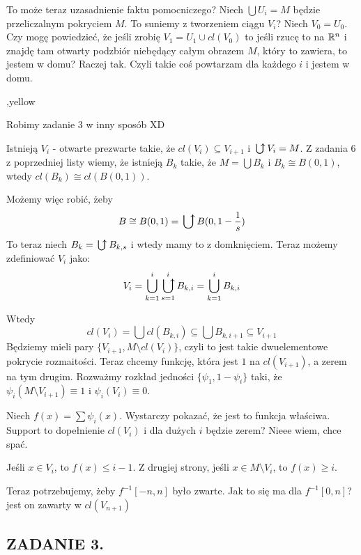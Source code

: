 \documentclass{article}
\begin{document}
To może teraz uzasadnienie faktu pomocniczego?
Niech $\bigcup U_i=M$ będzie przeliczalnym pokryciem $M$.
To suniemy z tworzeniem ciągu $V_i$? Niech $V_0=U_0$. Czy mogę powiedzieć, że jeśli zrobię $V_1=U_1\cup cl(V_0)$ to jeśli rzucę to na $\mathbb{R}^n$ i znajdę tam otwarty podzbiór niebędący całym obrazem $M$, który to zawiera, to jestem w domu? Raczej tak. Czyli takie coś powtarzam dla każdego $i$ i jestem w domu.

\sep{yellow}

Robimy zadanie 3 w inny sposób XD

Istnieją $V_i$ - otwarte prezwarte takie, że $cl(V_i)\subseteq V_{i+1}$ i $\abigcup V_i=M$. Z zadania 6 z poprzedniej listy wiemy, że istnieją $B_k$ takie, że $M=\bigcup B_k$ i $B_k\cong B(0,1)$, wtedy $cl(B_k)\cong cl(B(0,1))$. 

Możemy więc robić, żeby
$$B\cong B(0,1)=\abigcup B(0,1-\frac1{s})$$
To teraz niech $B_k=\abigcup B_{k,s}$ i wtedy mamy to z domknięciem. Teraz możemy zdefiniować $V_i$ jako:
$$V_i=\bigcup\limits_{k=1}^i\abigcup\limits_{s=1}^iB_{k,i}=\bigcup\limits_{k=1}^iB_{k,i}$$

Wtedy 
$$cl(V_i)=\bigcup cl(B_{k,i})\subseteq \bigcup B_{k,i+1}\subseteq V_{i+1}$$
Będziemy mieli pary $\{V_{i+1},M\setminus cl(V_i)\}$, czyli to jest takie dwuelementowe pokrycie rozmaitości. Teraz chcemy funkcję, która jest $1$ na $cl(V_{i+1})$, a zerem na tym drugim. Rozważmy rozkład jedności $\{\psi_1,1-\psi_i\}$ taki, że $\psi_i(M\setminus V_{i+1})\equiv 1$ i $\psi_i(V_i)\equiv 0$.

Niech $f(x)=\sum\psi_i(x)$. Wystarczy pokazać, że jest to funkcja właściwa. Support to dopełnienie $cl(V_i)$ i dla dużych $i$ będzie zerem? Nieee wiem, chce spać.

Jeśli $x\in V_i$, to $f(x)\leq i-1$. Z drugiej strony, jeśli $x\in M\setminus V_i$, to $f(x)\geq i$.

Teraz potrzebujemy, żeby $f^{-1}[-n,n]$ było zwarte. Jak to się ma dla $f^{-1}[0,n]$? jest on zawarty w $cl(V_{n+1})$











\subsection*{ZADANIE 3.}
\end{document}
